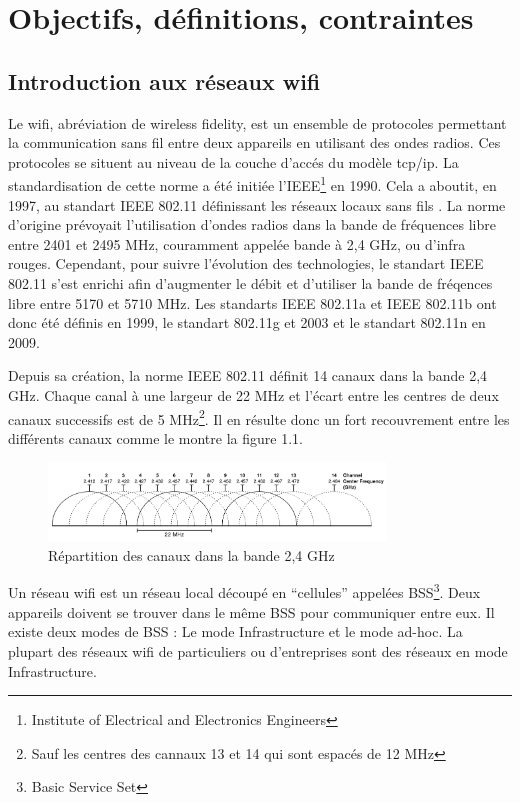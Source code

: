 \chapter{Objectifs, définitions, contraintes}
\section{Introduction aux réseaux wifi}

Le wifi, abréviation de wireless fidelity, est un ensemble de protocoles permettant la communication sans fil entre deux
appareils en utilisant des ondes radios. Ces protocoles se situent au niveau de la couche d'accés du modèle tcp/ip.
La standardisation de cette norme a été initiée l'IEEE\footnote{Institute of Electrical and Electronics Engineers} en 1990.
Cela a aboutit, en 1997, au standart IEEE 802.11 définissant les réseaux locaux sans fils \cite{WFintro}.
La norme d'origine prévoyait l'utilisation d'ondes radios dans la bande de fréquences libre entre 2401 et 2495 MHz,
couramment appelée bande à 2,4 GHz, ou d'infra rouges. Cependant, pour suivre l'évolution des technologies, le standart IEEE 
802.11 s'est enrichi afin d'augmenter le débit et d'utiliser la bande de fréqences libre entre 5170 et 5710 MHz.
Les standarts IEEE 802.11a et IEEE 802.11b ont donc été définis en 1999, le standart 802.11g et 2003 et le standart 802.11n
en 2009.

Depuis sa création, la norme IEEE 802.11 définit 14 canaux dans la bande 2,4 GHz. Chaque canal à une largeur de 22 MHz et 
l'écart entre les centres de deux canaux successifs est de 5 MHz\footnote{Sauf les centres des cannaux 13 et 14 qui sont espacés
de 12 MHz}. Il en résulte donc un fort recouvrement entre les différents canaux comme le montre la figure 1.1.

\begin{figure}
   \centering
   \includegraphics[width=0.8\textwidth,natwidth=610,natheight=642]{images/cannaux.png}
   \caption{Répartition des canaux dans la bande 2,4 GHz}
\end{figure}

Un réseau wifi est un réseau local découpé en ``cellules'' appelées BSS\footnote{Basic Service Set}. Deux appareils
doivent se trouver dans le même BSS pour communiquer entre eux. Il existe deux modes de BSS : Le mode Infrastructure et le
mode ad-hoc\cite{WFfunc2}. La plupart des réseaux wifi de particuliers ou d'entreprises sont des réseaux en mode Infrastructure.

